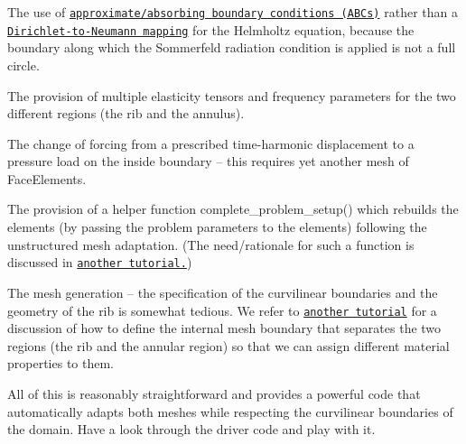 \begin{DoxyItemize}
\item The use of \href{../../../helmholtz/scattering/html/index.html#ABCs}{\tt approximate/absorbing boundary conditions (A\+B\+Cs)} rather than a \href{../../../helmholtz/scattering/html/index.html#DtN}{\tt Dirichlet-\/to-\/\+Neumann mapping} for the Helmholtz equation, because the boundary along which the Sommerfeld radiation condition is applied is not a full circle. ~\newline
~\newline

\item The provision of multiple elasticity tensors and frequency parameters for the two different regions (the rib and the annulus). ~\newline
~\newline

\item The change of forcing from a prescribed time-\/harmonic displacement to a pressure load on the inside boundary -- this requires yet another mesh of {\ttfamily Face\+Elements}. ~\newline
~\newline

\item The provision of a helper function {\ttfamily complete\+\_\+problem\+\_\+setup()} which rebuilds the elements (by passing the problem parameters to the elements) following the unstructured mesh adaptation. (The need/rationale for such a function is discussed in \href{../../../meshes/mesh_from_inline_triangle/html/index.html}{\tt another tutorial.}) ~\newline
~\newline

\item The mesh generation -- the specification of the curvilinear boundaries and the geometry of the rib is somewhat tedious. We refer to \href{../../../meshes/mesh_from_inline_triangle_internal_boundaries/html/index.html}{\tt another tutorial} for a discussion of how to define the internal mesh boundary that separates the two regions (the rib and the annular region) so that we can assign different material properties to them. ~\newline
~\newline

\end{DoxyItemize}All of this is reasonably straightforward and provides a powerful code that automatically adapts both meshes while respecting the curvilinear boundaries of the domain. Have a look through the driver code and play with it.



